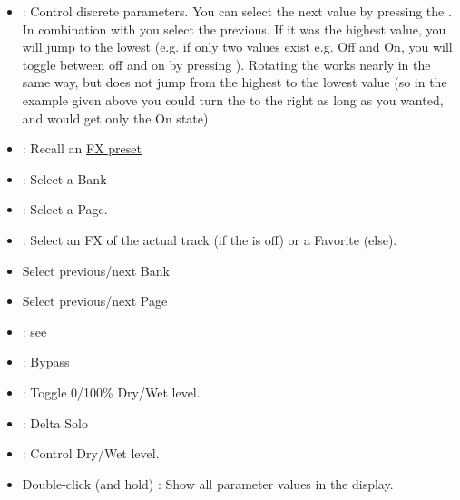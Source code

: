 \begin{itemize}
\item \vpot: Control discrete parameters. You can select the next
  value by pressing the \vpot. In combination with \shift you select
  the previous. If it was the highest value, you will jump to the
  lowest (e.g. if only two values exist e.g. Off and On, you will
  toggle between off and on by pressing \vpot). Rotating the \vpot
  works nearly in the same way, but does not jump from the highest to
  the lowest value (so in the example given above you could turn the
  \vpot to the right as long as you wanted, and would get only the On
  state).
\item \rec: Recall an \hyperref[fxpresets]{FX preset}
  \bemod
\item \solo: Select a Bank
  \bemod
\item \mute: Select a Page. 
  \bemod
\item \select: Select an FX of the actual track (if the \gv is off) or a
  Favorite (else). 
  \bemod
\item \bankdu Select  previous/next Bank
\item \channeldu Select  previous/next Page
\item \gv: see \select
\item \flip: Bypass
\item \shift \flip: Toggle 0/100\% Dry/Wet level.
\item \alt \flip: Delta Solo
\item \mfader: Control Dry/Wet level.
\item Double-click (and hold) \nv: Show all parameter values in the display.
\end{itemize}



